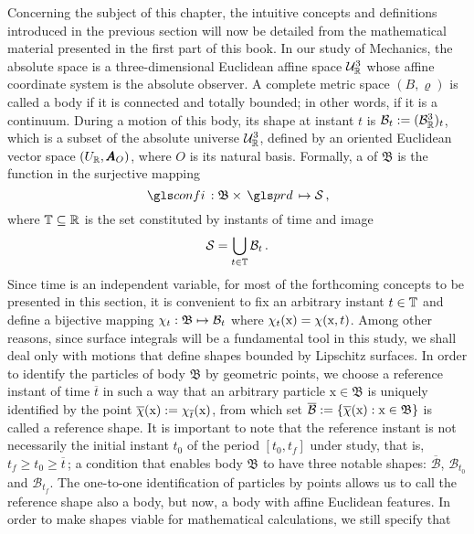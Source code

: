 Concerning the subject of this chapter, the intuitive concepts and definitions introduced in the previous section will now be detailed from the mathematical material presented in the first part of this book. In our study of Mechanics, the absolute space is a three-dimensional Euclidean affine space $\eamd{U}{R}{3}$ whose affine coordinate system is the absolute observer. A complete metric space $(B,\varrho)$ is called a body  if it is connected and totally bounded; in other words, if it is a continuum. During a motion of this body, its shape at instant $t$ is $\mathcal{B}_t:=(\eamd{B}{R}{3})_t$, which is a subset of the absolute universe $\eamd{U}{R}{3}$, defined by an oriented Euclidean vector space $(U_\real,\tnr{A}_O)$, where $O$ is its natural basis. Formally, a  of $\mathfrak{B}$ is the function in the surjective mapping 
\begin{equation}
\map{\gloref{confi}}{\mathfrak{B}\times\gloref{prd}}{\mathcal{S}}\,,
\end{equation}
where $\tempo\subseteq\real$ is the set constituted by instants of time and image 
\begin{equation}
\mathcal{S}=\bigcup_{t\in\tempo}\mathcal{B}_t\,.
\end{equation}
Since time is an independent variable, for most of the forthcoming concepts to be presented in this section, it is convenient to fix an arbitrary instant $t\in\tempo$ and define a bijective mapping $\map{\chi_t}{\mathfrak{B}}{\mathcal{B}_t}$ where $\fua{{\chi_t}}{\text{x}}=\fua{\chi}{\text{x},{t}}$. Among other reasons, since surface integrals will be a fundamental tool in this study, we shall deal only with motions that define shapes bounded by Lipschitz surfaces. In order to identify the particles of body $\mathfrak{B}$ by geometric points, we choose a reference instant of time $\overline{t}$ in such a way that an arbitrary particle $\text{x}\in\mathfrak{B}$ is uniquely identified by the point $\fua{\overline{\chi}}{\text{x}}:=\fua{\chi_{\overline{t}}}{\text{x}}$, from which set $\overline{\mathcal{B}}:=\{\fua{\overline{\chi}}{\text{x}}:\text{x}\in\mathfrak{B}\}$ is called a reference shape. It is important to note that the reference instant is not necessarily the initial instant $t_0$ of the period $[t_0,t_f]$ under study, that is, $t_f\geqslant t_0\geqslant\overline{t}\,$; a condition that enables body $\mathfrak{B}$ to have three notable shapes: $\overline{\mathcal{B}}$, $\mathcal{B}_{t_0}$ and $\mathcal{B}_{t_f}$. The one-to-one identification of particles by points allows us to call the reference shape also a body, but now, a body with affine Euclidean features. In order to make shapes viable for mathematical calculations, we still specify that
